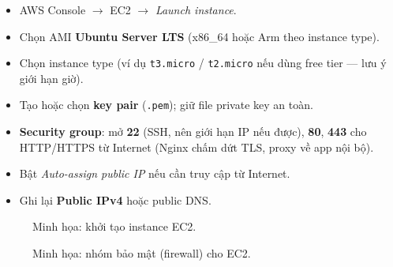 \begin{itemize}
    \item AWS Console $\rightarrow$ EC2 $\rightarrow$ \textit{Launch instance}.
    \item Chọn AMI \textbf{Ubuntu Server LTS} (x86\_64 hoặc Arm theo instance type).
    \item Chọn instance type (ví dụ \texttt{t3.micro} / \texttt{t2.micro} nếu dùng free tier --- lưu ý giới hạn giờ).
    \item Tạo hoặc chọn \textbf{key pair} (\texttt{.pem}); giữ file private key an toàn.
    \item \textbf{Security group}: mở \textbf{22} (SSH, nên giới hạn IP nếu được), \textbf{80}, \textbf{443} cho HTTP/HTTPS từ Internet (Nginx chấm dứt TLS, proxy về app nội bộ).
    \item Bật \textit{Auto-assign public IP} nếu cần truy cập từ Internet.
    \item Ghi lại \textbf{Public IPv4} hoặc public DNS.
\end{itemize}

\begin{figure}[H]
\centering
\caption{Minh họa: khởi tạo instance EC2.}
\label{fig:deploy-ec2-launch}
\end{figure}

\begin{figure}[H]
\centering
\caption{Minh họa: nhóm bảo mật (firewall) cho EC2.}
\label{fig:deploy-ec2-sg}
\end{figure}

